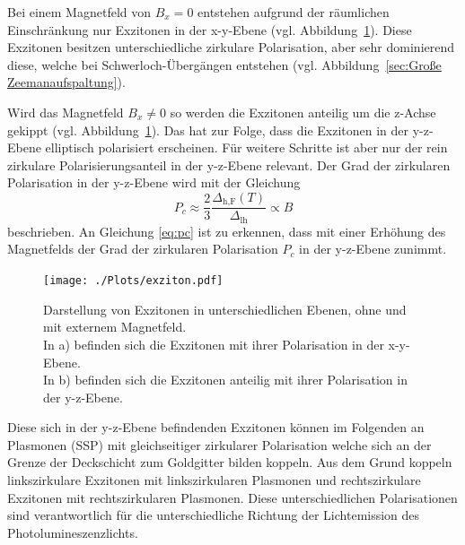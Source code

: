 Bei einem Magnetfeld von $B_{x} = 0$ entstehen aufgrund der räumlichen Einschränkung nur
Exzitonen in der x-y-Ebene (vgl. Abbildung~\ref{fig:exziton}).\cite{felix}
Diese Exzitonen besitzen unterschiedliche zirkulare Polarisation, aber sehr dominierend diese, welche bei 
Schwerloch-Übergängen entstehen (vgl. Abbildung~\ref{sec:Große Zeemanaufspaltung}).


Wird das Magnetfeld $B_{x} \neq 0 $ so werden die Exzitonen anteilig um die z-Achse gekippt (vgl. Abbildung~\ref{fig:exziton}).
Das hat zur Folge, dass die Exzitonen in der y-z-Ebene elliptisch polarisiert erscheinen. 
Für weitere Schritte ist aber nur der rein zirkulare Polarisierungsanteil in der y-z-Ebene relevant.
Der Grad der zirkularen Polarisation in der y-z-Ebene wird mit der Gleichung
\begin{equation}
    P_c \approx \frac{2}{3} \frac{\Delta_\text{h,F}(T)}{\Delta_\text{lh}} \propto B
    \label{eq:pc}
\end{equation}  %
beschrieben.
An Gleichung \ref{eq:pc} ist zu erkennen, dass mit einer Erhöhung des Magnetfelds der Grad der zirkularen Polarisation $P_{c}$
in der y-z-Ebene zunimmt.
\begin{figure}
    \centering
    \texttt{[image: ./Plots/exziton.pdf]}
    \caption{Darstellung von Exzitonen in unterschiedlichen Ebenen, ohne und mit externem Magnetfeld.\\
    In a) befinden sich die Exzitonen mit ihrer Polarisation in der x-y-Ebene.\\
    In b) befinden sich die Exzitonen anteilig mit ihrer Polarisation in der y-z-Ebene.\cite{lars}}
    \label{fig:exziton}
\end{figure}
\FloatBarrier

Diese sich in der y-z-Ebene befindenden Exzitonen können im Folgenden an
Plasmonen (SSP) mit gleichseitiger zirkularer Polarisation
welche sich an der Grenze der Deckschicht zum Goldgitter 
bilden koppeln.
Aus dem Grund koppeln linkszirkulare Exzitonen mit linkszirkularen Plasmonen und 
rechtszirkulare Exzitonen mit rechtszirkularen Plasmonen.
Diese unterschiedlichen Polarisationen sind verantwortlich für die 
unterschiedliche Richtung der Lichtemission des Photolumineszenzlichts.

